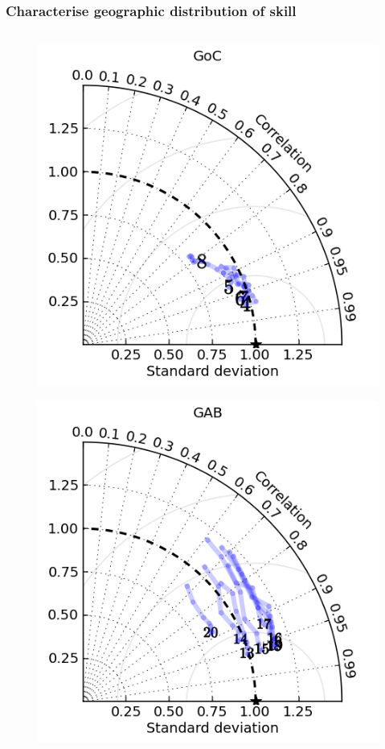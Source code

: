 \begin{frame}
\frametitle{Characterise geographic distribution of skill}
\begin{columns}
    \begin{column}{0.3\textwidth}
      \begin{figure}      
        \includegraphics[width=\textwidth]{figures/plots/taylor_diag_res_GoC.png}
      \end{figure}
      \begin{figure}      
        \includegraphics[width=\textwidth]{figures/plots/taylor_diag_res_GAB.png}

\end{figure}
\end{column}
\end{columns}
\end{frame}
